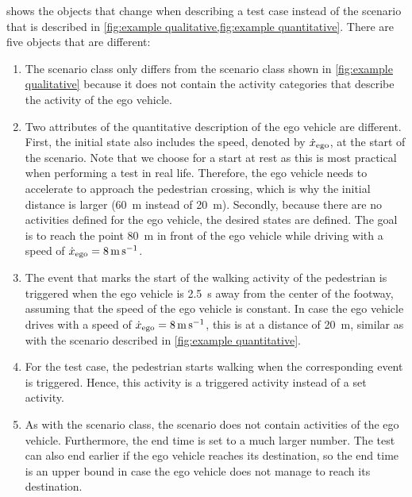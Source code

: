  shows the objects that change when describing a test case instead of the scenario that is described in \cref{fig:example qualitative,fig:example quantitative}. There are five objects that are different:
\begin{enumerate}
	\item The scenario class only differs from the scenario class shown in \cref{fig:example qualitative} because it does not contain the activity categories that describe the activity of the ego vehicle.
	\item Two attributes of the quantitative description of the ego vehicle are different. First, the initial state also includes the speed, denoted by $\dot{x}_{\mathrm{ego}}$, at the start of the scenario. Note that we choose for a start at rest as this is most practical when performing a test in real life. Therefore, the ego vehicle needs to accelerate to approach the pedestrian crossing, which is why the initial distance is larger (\SI{60}{\meter} instead of \SI{20}{\meter}). Secondly, because there are no activities defined for the ego vehicle, the desired states are defined. The goal is to reach the point \SI{80}{\meter} in front of the ego vehicle while driving with a speed of $\dot{x}_{\mathrm{ego}}=\SI{8}{\meter\per\second}$.
	\item The event that marks the start of the walking activity of the pedestrian is triggered when the ego vehicle is \SI{2.5}{\second} away from the center of the footway, assuming that the speed of the ego vehicle is constant. In case the ego vehicle drives with a speed of $\dot{x}_{\mathrm{ego}}=\SI{8}{\meter\per\second}$, this is at a distance of \SI{20}{\meter}, similar as with the scenario described in \cref{fig:example quantitative}.
	\item For the test case, the pedestrian starts walking when the corresponding event is triggered. Hence, this activity is a triggered activity instead of a set activity.
	\item As with the scenario class, the scenario does not contain activities of the ego vehicle. Furthermore, the end time is set to a much larger number. The test can also end earlier if the ego vehicle reaches its destination, so the end time is an upper bound in case the ego vehicle does not manage to reach its destination.
\end{enumerate}  

\cbend
